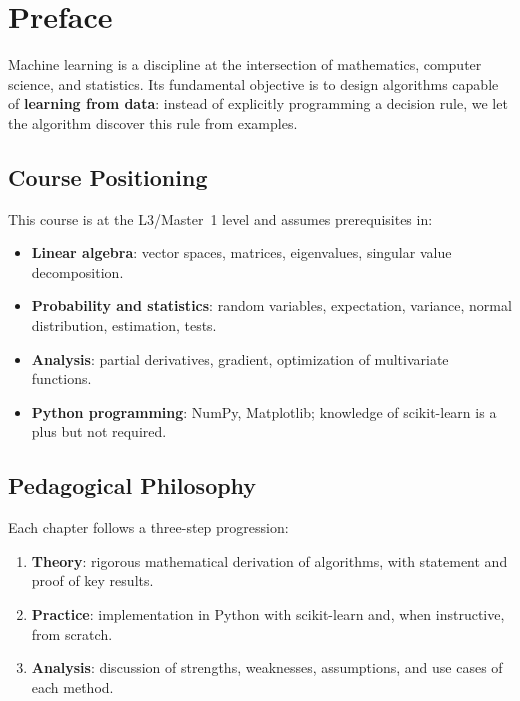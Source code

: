 \chapter*{Preface}

Machine learning is a discipline at the intersection of mathematics,
computer science, and statistics. Its fundamental objective is to design
algorithms capable of \textbf{learning from data}: instead of explicitly
programming a decision rule, we let the algorithm discover this rule from
examples.

\section*{Course Positioning}

This course is at the L3/Master~1 level and assumes prerequisites in:
\begin{itemize}
  \item \textbf{Linear algebra}: vector spaces, matrices, eigenvalues,
    singular value decomposition.
  \item \textbf{Probability and statistics}: random variables, expectation,
    variance, normal distribution, estimation, tests.
  \item \textbf{Analysis}: partial derivatives, gradient, optimization of
    multivariate functions.
  \item \textbf{Python programming}: NumPy, Matplotlib; knowledge of
    scikit-learn is a plus but not required.
\end{itemize}

\section*{Pedagogical Philosophy}

Each chapter follows a three-step progression:
\begin{enumerate}
  \item \textbf{Theory}: rigorous mathematical derivation of algorithms,
    with statement and proof of key results.
  \item \textbf{Practice}: implementation in Python with scikit-learn and,
    when instructive, from scratch.
  \item \textbf{Analysis}: discussion of strengths, weaknesses, assumptions,
    and use cases of each method.
\end{enumerate}

